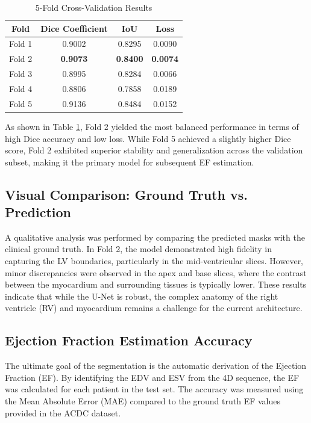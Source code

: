 \documentclass[final,3p,times,twocolumn]{elsarticle}
\begin{document}
\begin{table}[h]
\caption{5-Fold Cross-Validation Results}
\label{tab:kfold_results}
\centering
\begin{tabular}{|c|c|c|c|}
\hline
\textbf{Fold} & \textbf{Dice Coefficient} & \textbf{IoU} & \textbf{Loss} \\ \hline
Fold 1 & 0.9002 & 0.8295 & 0.0090 \\ \hline
Fold 2 & \textbf{0.9073} & \textbf{0.8400} & \textbf{0.0074} \\ \hline
Fold 3 & 0.8995 & 0.8284 & 0.0066 \\ \hline
Fold 4 & 0.8806 & 0.7858 & 0.0189 \\ \hline
Fold 5 & 0.9136 & 0.8484 & 0.0152 \\ \hline
\end{tabular}
\end{table}

As shown in Table \ref{tab:kfold_results}, Fold 2 yielded the most balanced performance in terms of high Dice accuracy and low loss. While Fold 5 achieved a slightly higher Dice score, Fold 2 exhibited superior stability and generalization across the validation subset, making it the primary model for subsequent EF estimation.

\subsection{Visual Comparison: Ground Truth vs. Prediction}
A qualitative analysis was performed by comparing the predicted masks with the clinical ground truth. In Fold 2, the model demonstrated high fidelity in capturing the LV boundaries, particularly in the mid-ventricular slices. However, minor discrepancies were observed in the apex and base slices, where the contrast between the myocardium and surrounding tissues is typically lower. These results indicate that while the U-Net is robust, the complex anatomy of the right ventricle (RV) and myocardium remains a challenge for the current architecture.

\subsection{Ejection Fraction Estimation Accuracy}
The ultimate goal of the segmentation is the automatic derivation of the Ejection Fraction (EF). By identifying the EDV and ESV from the 4D sequence, the EF was calculated for each patient in the test set. The accuracy was measured using the Mean Absolute Error (MAE) compared to the ground truth EF values provided in the ACDC dataset.
\end{document}
